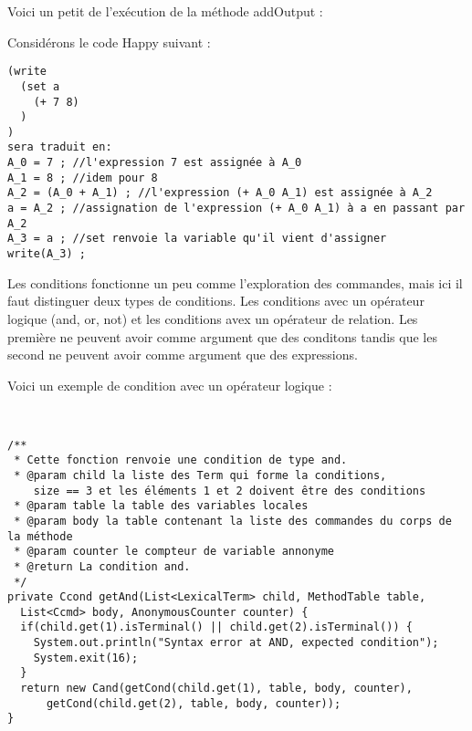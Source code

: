  
Voici un petit de l'exécution de la méthode addOutput :

Considérons le code Happy suivant :
\begin{verbatim}
(write 
  (set a 
    (+ 7 8)
  )
)
sera traduit en:
A_0 = 7 ; //l'expression 7 est assignée à A_0
A_1 = 8 ; //idem pour 8
A_2 = (A_0 + A_1) ; //l'expression (+ A_0 A_1) est assignée à A_2
a = A_2 ; //assignation de l'expression (+ A_0 A_1) à a en passant par A_2
A_3 = a ; //set renvoie la variable qu'il vient d'assigner
write(A_3) ;

\end{verbatim}

Les conditions fonctionne un peu comme l'exploration des commandes, mais ici il faut distinguer deux types de conditions.
Les conditions avec un opérateur logique (and, or, not) et les conditions avex un opérateur de relation. Les première ne peuvent avoir 
comme argument que des conditons tandis que les second ne peuvent avoir comme argument que des expressions. 

Voici un exemple de condition avec un opérateur logique :
{\tiny
\begin{verbatim}


/**
 * Cette fonction renvoie une condition de type and.
 * @param child la liste des Term qui forme la conditions, 
    size == 3 et les éléments 1 et 2 doivent être des conditions
 * @param table la table des variables locales
 * @param body la table contenant la liste des commandes du corps de la méthode
 * @param counter le compteur de variable annonyme
 * @return La condition and.
 */
private Ccond getAnd(List<LexicalTerm> child, MethodTable table, 
  List<Ccmd> body, AnonymousCounter counter) {
  if(child.get(1).isTerminal() || child.get(2).isTerminal()) {
    System.out.println("Syntax error at AND, expected condition");
    System.exit(16);
  }
  return new Cand(getCond(child.get(1), table, body, counter),
      getCond(child.get(2), table, body, counter));
}
 
\end{verbatim}}

